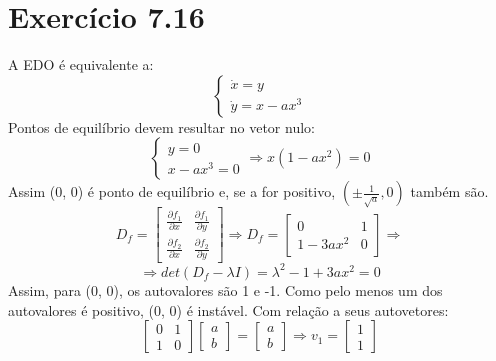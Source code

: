 \documentclass{article}[twocolumn]
\begin{document}
	\section{Exerc\'icio 7.16}
	A EDO \'e equivalente a:
	\begin{equation}
		\left\{\begin{array}{l}
			\dot{x} = y\\
			\dot{y} = x - ax^3
		\end{array}\right.
		\nonumber
	\end{equation}
	Pontos de equil\'ibrio devem resultar no vetor nulo:
	\begin{equation}
		\left\{\begin{array}{l}
			y = 0\\
			x - ax^3 = 0
		\end{array}\right. \Rightarrow x(1 - ax^2) = 0
		\nonumber
	\end{equation}
	Assim (0, 0) \'e ponto de equil\'ibrio e, se a for positivo, $(\pm\frac{1}{\sqrt{a}}, 0)$
	tamb\'em s\~ao.
	\begin{equation}
		D_f = \left[\begin{array}{cc}
			\frac{\partial f_1}{\partial x} & \frac{\partial f_1}{\partial y}\\
			\frac{\partial f_2}{\partial x} & \frac{\partial f_2}{\partial y}
		\end{array}\right] \Rightarrow
		D_f = \left[\begin{array}{cc}
			0 & 1\\
			1 - 3ax^2 & 0
		\end{array}\right] \Rightarrow
		\nonumber
	\end{equation}
	\begin{equation}
		\Rightarrow det(D_f - \lambda I) = \lambda^2 - 1 + 3ax^2 = 0
		\label{eq:characteristic}
	\end{equation}
	Assim, para (0, 0), os autovalores s\~ao 1 e -1. Como pelo menos um dos autovalores \'e
	positivo, (0, 0) \'e inst\'avel. Com rela\c{c}\~ao a seus autovetores:
	\begin{equation}
		\left[\begin{array}{cc}
			0 & 1\\
			1 & 0
		\end{array}\right]
		\left[\begin{array}{c}
			a\\
			b
		\end{array}\right] =
		\left[\begin{array}{c}
			a\\
			b
		\end{array}\right] \Rightarrow v_1 =
		\left[\begin{array}{c}
			1\\
			1
		\end{array}\right]
		\nonumber
	\end{equation}
\end{document}
